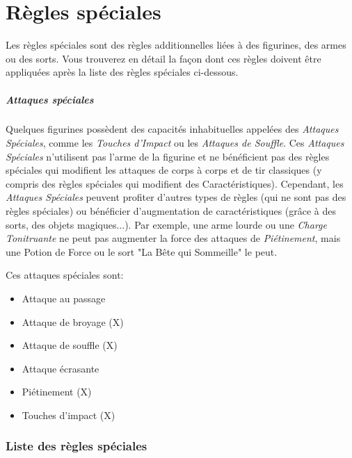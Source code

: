 
\part{Règles spéciales}

Les règles spéciales sont des règles additionnelles liées à des figurines, des armes ou des sorts. Vous trouverez en détail la façon dont ces règles doivent être appliquées après la liste des règles spéciales ci-dessous.


\subsubsection*{Attaques spéciales}

Quelques figurines possèdent des capacités inhabituelles appelées des \emph{Attaques Spéciales}, comme les \emph{Touches d'Impact} ou les \emph{Attaques de Souffle}. Ces \emph{Attaques Spéciales} n'utilisent pas l'arme de la figurine et ne bénéficient pas des règles spéciales qui modifient les attaques de corps à corps et de tir classiques (y compris des règles spéciales qui modifient des Caractéristiques). Cependant, les \emph{Attaques Spéciales} peuvent profiter d'autres types de règles (qui ne sont pas des règles spéciales) ou bénéficier d'augmentation de caractéristiques (grâce à des sorts, des objets magiques...). Par exemple, une arme lourde ou une \emph{Charge Tonitruante} ne peut pas augmenter la force des attaques de \emph{Piétinement}, mais une Potion de Force ou le sort "La Bête qui Sommeille" le peut.

Ces attaques spéciales sont:
\begin{itemize}
\item Attaque au passage
\item Attaque de broyage (X)
\item Attaque de souffle (X)
\item Attaque écrasante
\item Piétinement (X)
\item Touches d'impact (X) 
\end{itemize} 

\section{Liste des règles spéciales} 


